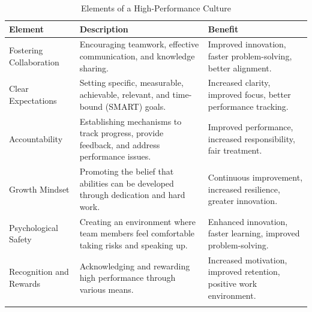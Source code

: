 \begin{longtable}{|p{4cm}|p{5cm}|p{4cm}|}
    \hline
    \textbf{Element}        & \textbf{Description}                                                                         & \textbf{Benefit}                                                     \\
    \hline
    Fostering Collaboration & Encouraging teamwork, effective communication, and knowledge sharing.                        & Improved innovation, faster problem-solving, better alignment.       \\
    \hline
    Clear Expectations      & Setting specific, measurable, achievable, relevant, and time-bound (SMART) goals.            & Increased clarity, improved focus, better performance tracking.      \\
    \hline
    Accountability          & Establishing mechanisms to track progress, provide feedback, and address performance issues. & Improved performance, increased responsibility, fair treatment.      \\
    \hline
    Growth Mindset          & Promoting the belief that abilities can be developed through dedication and hard work.       & Continuous improvement, increased resilience, greater innovation.    \\
    \hline
    Psychological Safety    & Creating an environment where team members feel comfortable taking risks and speaking up.    & Enhanced innovation, faster learning, improved problem-solving.      \\
    \hline
    Recognition and Rewards & Acknowledging and rewarding high performance through various means.                          & Increased motivation, improved retention, positive work environment. \\
    \hline
    \caption{Elements of a High-Performance Culture}
    \label{tab:high_performance_elements}                                                                                                                                                         \\
\end{longtable}

